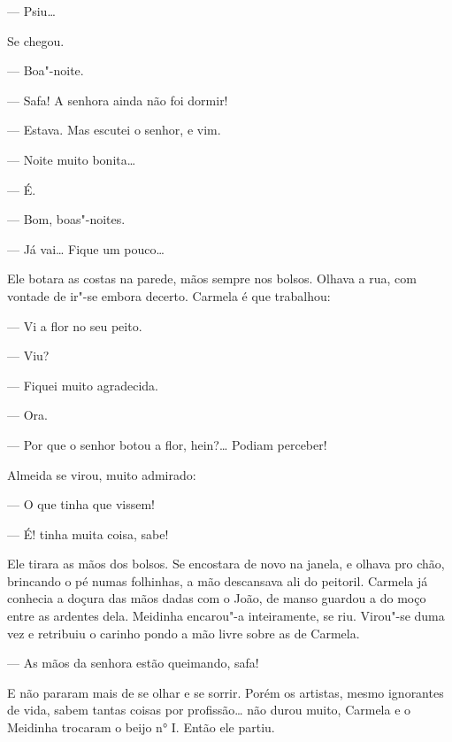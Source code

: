 \begin{linenumbers}
--- Psiu\ldots{}

Se chegou.

--- Boa"-noite.

--- Safa! A senhora ainda não foi dormir!

--- Estava. Mas escutei o senhor, e vim.

--- Noite muito bonita\ldots{}

--- É.

--- Bom, boas"-noites.

--- Já vai\ldots{} Fique um pouco\ldots{}

Ele botara as costas na parede, mãos sempre nos bolsos. Olhava a rua,
com vontade de ir"-se embora decerto. Carmela é que trabalhou:

--- Vi a flor no seu peito.

--- Viu?

--- Fiquei muito agradecida.

--- Ora.

--- Por que o senhor botou a flor, hein?\ldots{} Podiam perceber!

Almeida se virou, muito admirado:

--- O que tinha que vissem!

--- É! tinha muita coisa, sabe! 

Ele tirara as mãos dos bolsos. Se encostara de novo na janela, e olhava
pro chão, brincando o pé numas folhinhas, a mão descansava ali do
peitoril. Carmela já conhecia a doçura das mãos dadas com o João, de
manso guardou a do moço entre as ardentes dela. Meidinha encarou"-a
inteiramente, se riu. Virou"-se duma vez e retribuiu o carinho pondo a
mão livre sobre as de Carmela.

--- As mãos da senhora estão queimando, safa!

E não pararam mais de se olhar e se sorrir. Porém os artistas, mesmo
ignorantes de vida, sabem tantas coisas por profissão\ldots{} não durou
muito, Carmela e o Meidinha trocaram o beijo n° I. Então ele partiu.


\end{linenumbers}
